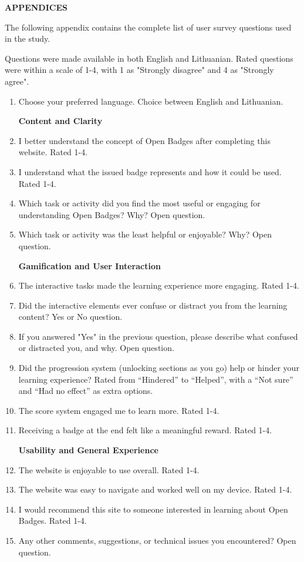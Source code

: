\appendix

\begin{center}
    \Large \textbf{APPENDICES}
\end{center}
\vspace{1cm}

\label{appendix:survey}
\vspace{0.5em}

The following appendix contains the complete list of user survey questions used in the study.

Questions were made available in both English and Lithuanian. Rated questions were within a scale of 1-4, with 1 as "Strongly disagree" and 4 as "Strongly agree".
\begin{enumerate}
  \item Choose your preferred language. Choice between English and Lithuanian.

  \textbf{Content and Clarity}
  \item I better understand the concept of Open Badges after completing this website. Rated 1-4.
  \item I understand what the issued badge represents and how it could be used. Rated 1-4.
  \item Which task or activity did you find the most useful or engaging for understanding Open Badges? Why? Open question.
  \item Which task or activity was the least helpful or enjoyable? Why? Open question.
  
  \textbf{Gamification and User Interaction}
  \item The interactive tasks made the learning experience more engaging. Rated 1-4.
  \item Did the interactive elements ever confuse or distract you from the learning content? Yes or No question.
  \item If you answered "Yes" in the previous question, please describe what confused or distracted you, and why. Open question.
  \item Did the progression system (unlocking sections as you go) help or hinder your learning experience? Rated from “Hindered” to “Helped”, with a “Not sure” and “Had no effect” as extra options.
  \item The score system engaged me to learn more. Rated 1-4.
  \item Receiving a badge at the end felt like a meaningful reward. Rated 1-4.

  \textbf{Usability and General Experience}
  \item The website is enjoyable to use overall. Rated 1-4.
  \item The website was easy to navigate and worked well on my device. Rated 1-4.
  \item I would recommend this site to someone interested in learning about Open Badges. Rated 1-4.
  \item Any other comments, suggestions, or technical issues you encountered? Open question.
\end{enumerate}

